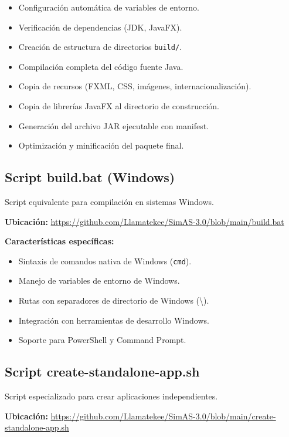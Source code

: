 \begin{itemize}
    \item Configuración automática de variables de entorno.
    \item Verificación de dependencias (JDK, JavaFX).
    \item Creación de estructura de directorios \texttt{build/}.
    \item Compilación completa del código fuente Java.
    \item Copia de recursos (FXML, CSS, imágenes, internacionalización).
    \item Copia de librerías JavaFX al directorio de construcción.  
    \item Generación del archivo JAR ejecutable con manifest.
    \item Optimización y minificación del paquete final.
\end{itemize}

\subsection{Script build.bat (Windows)}

Script equivalente para compilación en sistemas Windows.

\textbf{Ubicación:} \url{https://github.com/Llamatekee/SimAS-3.0/blob/main/build.bat}

\textbf{Características específicas:}
\begin{itemize}
    \item Sintaxis de comandos nativa de Windows (\texttt{cmd}).
    \item Manejo de variables de entorno de Windows.
    \item Rutas con separadores de directorio de Windows (\textbackslash).
    \item Integración con herramientas de desarrollo Windows.
    \item Soporte para PowerShell y Command Prompt.
\end{itemize}

\subsection{Script create-standalone-app.sh}

Script especializado para crear aplicaciones independientes.

\textbf{Ubicación:} \url{https://github.com/Llamatekee/SimAS-3.0/blob/main/create-standalone-app.sh}

